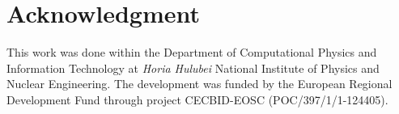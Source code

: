 \documentclass[conference]{IEEEtran}
\begin{document}

\section*{Acknowledgment}

This work was done within the Department of Computational Physics and Information Technology at \emph{Horia Hulubei} National Institute of Physics and Nuclear Engineering. The development was funded by the European Regional Development Fund through project CECBID-EOSC (POC/397/1/1-124405).



\end{document}
